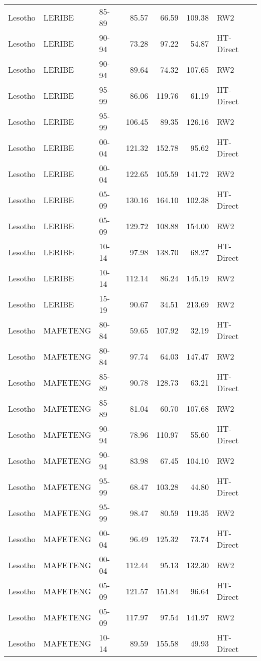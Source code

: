 \begin{longtable}{lllrrrl}
  Lesotho & LERIBE & 85-89 & 85.57 & 66.59 & 109.38 & RW2 \\ 
  Lesotho & LERIBE & 90-94 & 73.28 & 97.22 & 54.87 & HT-Direct \\ 
  Lesotho & LERIBE & 90-94 & 89.64 & 74.32 & 107.65 & RW2 \\ 
  Lesotho & LERIBE & 95-99 & 86.06 & 119.76 & 61.19 & HT-Direct \\ 
  Lesotho & LERIBE & 95-99 & 106.45 & 89.35 & 126.16 & RW2 \\ 
  Lesotho & LERIBE & 00-04 & 121.32 & 152.78 & 95.62 & HT-Direct \\ 
  Lesotho & LERIBE & 00-04 & 122.65 & 105.59 & 141.72 & RW2 \\ 
  Lesotho & LERIBE & 05-09 & 130.16 & 164.10 & 102.38 & HT-Direct \\ 
  Lesotho & LERIBE & 05-09 & 129.72 & 108.88 & 154.00 & RW2 \\ 
  Lesotho & LERIBE & 10-14 & 97.98 & 138.70 & 68.27 & HT-Direct \\ 
  Lesotho & LERIBE & 10-14 & 112.14 & 86.24 & 145.19 & RW2 \\ 
  Lesotho & LERIBE & 15-19 & 90.67 & 34.51 & 213.69 & RW2 \\ 
  Lesotho & MAFETENG & 80-84 & 59.65 & 107.92 & 32.19 & HT-Direct \\ 
  Lesotho & MAFETENG & 80-84 & 97.74 & 64.03 & 147.47 & RW2 \\ 
  Lesotho & MAFETENG & 85-89 & 90.78 & 128.73 & 63.21 & HT-Direct \\ 
  Lesotho & MAFETENG & 85-89 & 81.04 & 60.70 & 107.68 & RW2 \\ 
  Lesotho & MAFETENG & 90-94 & 78.96 & 110.97 & 55.60 & HT-Direct \\ 
  Lesotho & MAFETENG & 90-94 & 83.98 & 67.45 & 104.10 & RW2 \\ 
  Lesotho & MAFETENG & 95-99 & 68.47 & 103.28 & 44.80 & HT-Direct \\ 
  Lesotho & MAFETENG & 95-99 & 98.47 & 80.59 & 119.35 & RW2 \\ 
  Lesotho & MAFETENG & 00-04 & 96.49 & 125.32 & 73.74 & HT-Direct \\ 
  Lesotho & MAFETENG & 00-04 & 112.44 & 95.13 & 132.30 & RW2 \\ 
  Lesotho & MAFETENG & 05-09 & 121.57 & 151.84 & 96.64 & HT-Direct \\ 
  Lesotho & MAFETENG & 05-09 & 117.97 & 97.54 & 141.97 & RW2 \\ 
  Lesotho & MAFETENG & 10-14 & 89.59 & 155.58 & 49.93 & HT-Direct \\ 

\end{longtable}
